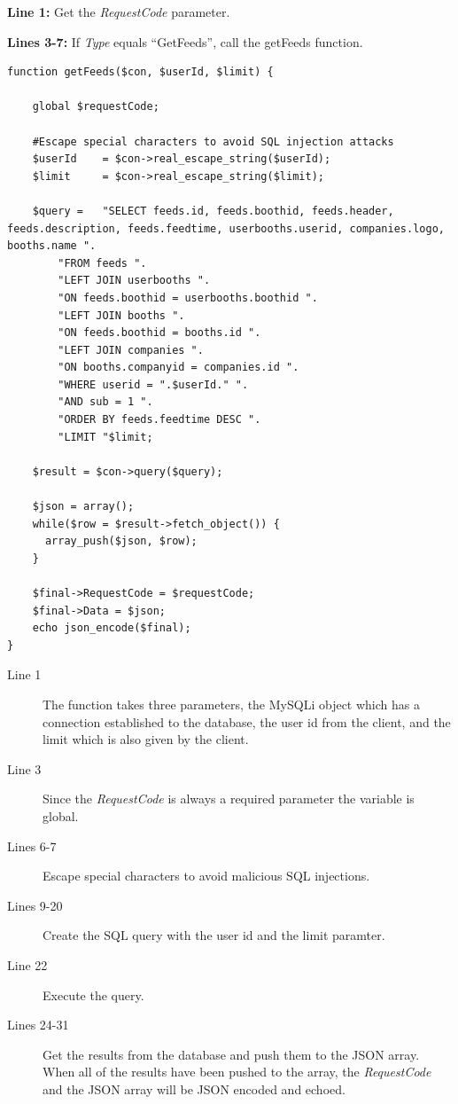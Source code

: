 \begin{description}
\item \textbf{Line 1: }Get the \textit{RequestCode} parameter.
\item \textbf{Lines 3-7: }If \textit{Type} equals ``GetFeeds'', call the getFeeds function.
\end{description}


\begin{lstlisting}[language=phpstyle, label=lst:getFeeds, caption={getFeeds function}]
function getFeeds($con, $userId, $limit) {

    global $requestCode;

    #Escape special characters to avoid SQL injection attacks
    $userId    = $con->real_escape_string($userId);
    $limit     = $con->real_escape_string($limit);

    $query =   "SELECT feeds.id, feeds.boothid, feeds.header, feeds.description, feeds.feedtime, userbooths.userid, companies.logo, booths.name ".
        "FROM feeds ".
        "LEFT JOIN userbooths ".
        "ON feeds.boothid = userbooths.boothid ".
        "LEFT JOIN booths ".
        "ON feeds.boothid = booths.id ".
        "LEFT JOIN companies ".
        "ON booths.companyid = companies.id ".
        "WHERE userid = ".$userId." ".
        "AND sub = 1 ".
        "ORDER BY feeds.feedtime DESC ".
        "LIMIT "$limit;

    $result = $con->query($query);

    $json = array();
    while($row = $result->fetch_object()) {
      array_push($json, $row);
    }
    
    $final->RequestCode = $requestCode;
    $final->Data = $json;
    echo json_encode($final);
}
\end{lstlisting}

\begin{description}
\item[Line 1] The function takes three parameters, the MySQLi object which has a connection
  established to the database, the user id from the client, and the limit which is also given by the client.
\item[Line 3] Since the \textit{RequestCode} is always a required parameter the variable is global.
\item[Lines 6-7] Escape special characters to avoid malicious SQL injections.
\item[Lines 9-20] Create the SQL query with the user id and the limit paramter.
\item[Line 22] Execute the query.
\item[Lines 24-31] Get the results from the database and push them to the JSON array. When
  all of the results have been pushed to the array, the \textit{RequestCode} and the JSON array will be JSON encoded and echoed.
\end{description}

